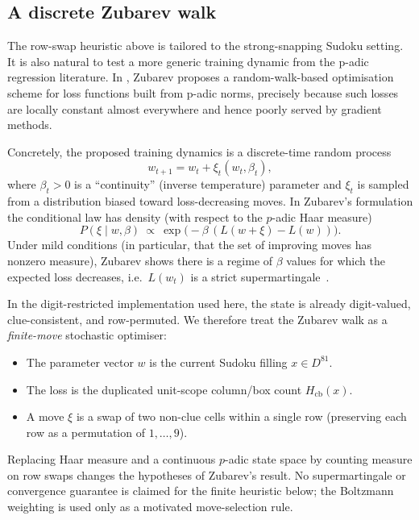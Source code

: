 \documentclass[11pt]{article}
\begin{document}
\subsection{A discrete Zubarev walk}
The row-swap heuristic above is tailored to the strong-snapping Sudoku setting. It is also natural to test a more generic training dynamic from the p-adic regression literature. In \cite{zubarev2025padic}, Zubarev proposes a random-walk-based optimisation scheme for loss functions built from p-adic norms, precisely because such losses are locally constant almost everywhere and hence poorly served by gradient methods.

Concretely, the proposed training dynamics is a discrete-time random process
\begin{equation}
w_{t+1} = w_t + \xi_t(w_t,\beta_t),
\label{eq:zubarev-walk}
\end{equation}
where $\beta_t>0$ is a ``continuity'' (inverse temperature) parameter and $\xi_t$ is sampled from a distribution biased toward loss-decreasing moves. In Zubarev's formulation the conditional law has density (with respect to the $p$-adic Haar measure)
\begin{equation}
P(\xi \mid w,\beta)\ \propto\ \exp\!\bigl(-\beta\,(L(w+\xi)-L(w))\bigr).
\label{eq:zubarev-boltzmann}
\end{equation}
Under mild conditions (in particular, that the set of improving moves has nonzero measure), Zubarev shows there is a regime of $\beta$ values for which the expected loss decreases, i.e.\ $L(w_t)$ is a strict supermartingale~\cite{zubarev2025padic}.

In the digit-restricted implementation used here, the state is already digit-valued, clue-consistent, and row-permuted. We therefore treat the Zubarev walk as a \emph{finite-move} stochastic optimiser:
\begin{itemize}
    \item The parameter vector $w$ is the current Sudoku filling $x\in D^{81}$.
    \item The loss is the duplicated unit-scope column/box count \(H_{\mathrm{cb}}(x)\).
    \item A move $\xi$ is a swap of two non-clue cells within a single row (preserving each row as a permutation of $1,\dots,9$).
\end{itemize}
Replacing Haar measure and a continuous \(p\)-adic state space by counting measure on row swaps changes the hypotheses of Zubarev's result. No supermartingale or convergence guarantee is claimed for the finite heuristic below; the Boltzmann weighting is used only as a motivated move-selection rule.
\end{document}
